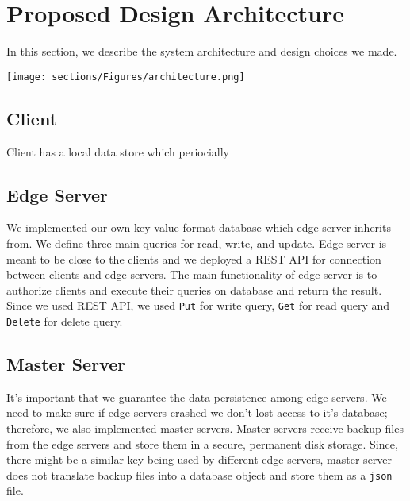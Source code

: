 \section{Proposed Design Architecture}
\label{sec:Solution}
In this section, we describe the system architecture and design choices we made. 

\texttt{[image: sections/Figures/architecture.png]}

\subsection{Client}

Client has a local data store which periocially 

\subsection{Edge Server}
We implemented our own key-value format database which edge-server inherits from. We define three main queries for read, write, and update. Edge server is meant to be close to the clients and we deployed a REST API for connection between clients and edge servers. The main functionality of edge server is to authorize clients and execute their queries on database and return the result. Since we used REST API, we used \texttt{Put} for write query, \texttt{Get} for read query and \texttt{Delete} for delete query.


\subsection{Master Server}
It's important that we guarantee the data persistence among edge servers. We need to make sure if edge servers crashed we don't lost access to it's database; therefore, we also implemented master servers.
Master servers receive backup files from the edge servers and store them in a secure, permanent disk storage. Since, there might be a similar key being used by different edge servers, master-server does not translate backup files into a database object and store them as a \texttt{json} file.
